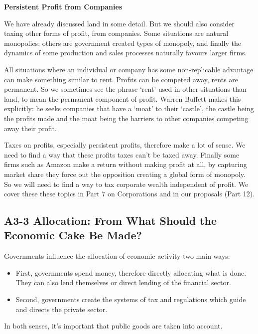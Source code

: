 \documentclass[]{tufte-handout}
\providecommand{\tightlist}{%
  \setlength{\itemsep}{0pt}\setlength{\parskip}{0pt}}
\begin{document}
\textbf{Persistent Profit from Companies}

We have already discussed land in some detail. But we should also
consider taxing other forms of profit, from companies. Some situations
are natural monopolies; others are government created types of monopoly,
and finally the dynamics of some production and sales processes
naturally favours larger firms.

All situations where an individual or company has some non-replicable
advantage can make something similar to rent. Profits can be competed
away, rents are permanent. So we sometimes see the phrase `rent' used in
other situations than land, to mean the permanent component of profit.
Warren Buffett makes this explicitly: he seeks companies that have a
`moat' to their `castle', the castle being the profits made and the moat
being the barriers to other companies competing away their profit.

Taxes on profits, especially persistent profits, therefore make a lot of
sense. We need to find a way that these profits taxes can't be taxed
away. Finally some firms such as Amazon make a return without making
profit at all, by capturing market share they force out the opposition
creating a global form of monopoly. So we will need to find a way to tax
corporate wealth independent of profit. We cover these these topics in
Part 7 on Corporations and in our proposals (Part 12).

\hypertarget{a3-3-allocation-from-what-should-the-economic-cake-be-made}{%
\subsection{A3-3 Allocation: From What Should the Economic Cake Be
Made?}\label{a3-3-allocation-from-what-should-the-economic-cake-be-made}}

Governments influence the allocation of economic activity two main ways:

\begin{itemize}
\tightlist
\item
  First, governments spend money, therefore directly allocating what is
  done. They can also lend themselves or direct lending of the financial
  sector.
\item
  Second, governments create the systems of tax and regulations which
  guide and directs the private sector.
\end{itemize}

In both senses, it's important that public goods are taken into account.
\end{document}
